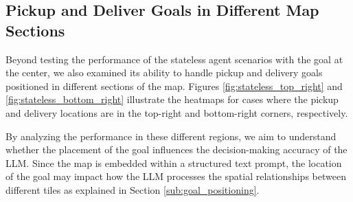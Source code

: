 \subsection{Pickup and Deliver Goals in Different Map Sections}

Beyond testing the performance of the stateless agent scenarios with the goal at
the center, we also examined its ability to handle pickup and delivery goals positioned
in different sections of the map. Figures \ref{fig:stateless_top_right} and
\ref{fig:stateless_bottom_right} illustrate the heatmaps for cases where the
pickup and delivery locations are in the top-right and bottom-right corners, respectively.

By analyzing the performance in these different regions, we aim to understand
whether the placement of the goal influences the decision-making accuracy of the
LLM. Since the map is embedded within a structured text prompt, the location of
the goal may impact how the LLM processes the spatial relationships between
different tiles as explained in Section \ref{sub:goal_positioning}.

